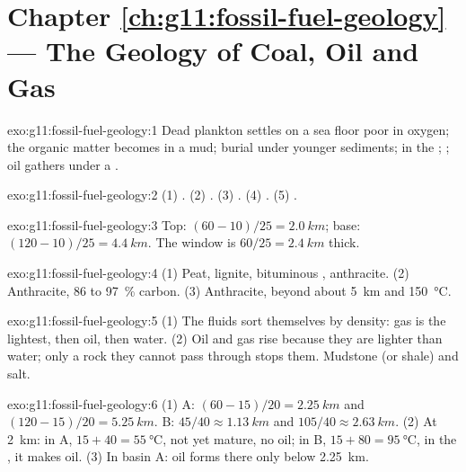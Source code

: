 \section*{Chapter \ref{ch:g11:fossil-fuel-geology} --- The Geology of Coal, Oil and Gas}

\begin{solution}{exo:g11:fossil-fuel-geology:1}
Dead plankton settles on a sea floor poor in oxygen; the organic matter
becomes  in a mud; burial under younger sediments;  in the
; ; oil gathers under a .
\end{solution}

\begin{solution}{exo:g11:fossil-fuel-geology:2}
(1) . (2) . (3) . (4) . (5) .
\end{solution}

\begin{solution}{exo:g11:fossil-fuel-geology:3}
Top: $(60 - 10)/25 = \qty{2.0}{km}$; base: $(120 - 10)/25 = \qty{4.4}{km}$.
The window is $60/25 = \qty{2.4}{km}$ thick.
\end{solution}

\begin{solution}{exo:g11:fossil-fuel-geology:4}
(1) Peat, lignite, bituminous , anthracite. (2) Anthracite, 86 to
\qty{97}{\percent} carbon. (3) Anthracite, beyond about \qty{5}{km} and
\qty{150}{\degreeCelsius}.
\end{solution}

\begin{solution}{exo:g11:fossil-fuel-geology:5}
(1) The fluids sort themselves by density: gas is the lightest, then oil,
then water. (2) Oil and gas rise because they are lighter than water; only
a rock they cannot pass through stops them. Mudstone (or shale) and salt.
\end{solution}

\begin{solution}{exo:g11:fossil-fuel-geology:6}
(1) A: $(60 - 15)/20 = \qty{2.25}{km}$ and $(120 - 15)/20 = \qty{5.25}{km}$.
B: $45/40 \approx \qty{1.13}{km}$ and $105/40 \approx \qty{2.63}{km}$.
(2) At \qty{2}{km}: in A, $15 + 40 = \qty{55}{\degreeCelsius}$, not yet
mature, no oil; in B, $15 + 80 = \qty{95}{\degreeCelsius}$, in the , it makes oil. (3) In basin A: oil forms there only below
\qty{2.25}{km}.
\end{solution}

